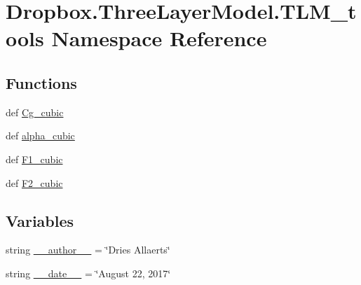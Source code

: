 \hypertarget{namespaceDropbox_1_1ThreeLayerModel_1_1TLM__tools}{\section{Dropbox.\+Three\+Layer\+Model.\+T\+L\+M\+\_\+tools Namespace Reference}
\label{namespaceDropbox_1_1ThreeLayerModel_1_1TLM__tools}
}
\subsection*{Functions}
\begin{DoxyCompactItemize}
\item 
def \hyperlink{namespaceDropbox_1_1ThreeLayerModel_1_1TLM__tools_a340f21b8b69aacc35123caf4e19f4875}{Cg\+\_\+cubic}
\item 
def \hyperlink{namespaceDropbox_1_1ThreeLayerModel_1_1TLM__tools_a65b8de892b34b08162574e54fe2f4989}{alpha\+\_\+cubic}
\item 
def \hyperlink{namespaceDropbox_1_1ThreeLayerModel_1_1TLM__tools_a8cc596efdd8e8ba721f42a24fd8d4d84}{F1\+\_\+cubic}
\item 
def \hyperlink{namespaceDropbox_1_1ThreeLayerModel_1_1TLM__tools_a378f86705a60293f8218a594c94e041e}{F2\+\_\+cubic}
\end{DoxyCompactItemize}
\subsection*{Variables}
\begin{DoxyCompactItemize}
\item 
string \hyperlink{namespaceDropbox_1_1ThreeLayerModel_1_1TLM__tools_a84d998ae3b73a3154b5d5778a6fd81e7}{\+\_\+\+\_\+author\+\_\+\+\_\+} = \char`\"{}Dries Allaerts\char`\"{}
\item 
string \hyperlink{namespaceDropbox_1_1ThreeLayerModel_1_1TLM__tools_a0aefac305a9a1c76ae8110db1a86cd18}{\+\_\+\+\_\+date\+\_\+\+\_\+} = \char`\"{}August 22, 2017\char`\"{}
\end{DoxyCompactItemize}


